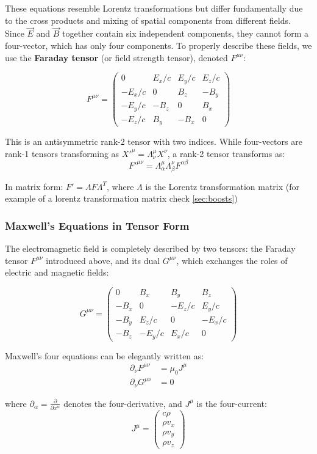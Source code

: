 \documentclass{article}
\begin{document}
These equations resemble Lorentz transformations but differ fundamentally due to the cross products and mixing of spatial components from different fields. Since $\vec{E}$ and $\vec{B}$ together contain six independent components, they cannot form a four-vector, which has only four components. To properly describe these fields, we use the \textbf{Faraday tensor} (or field strength tensor), denoted $F^{\mu\nu}$:

\[F^{\mu\nu} = \begin{pmatrix} 0 & E_x/c & E_y/c & E_z/c \\ -E_x/c & 0 & B_z & -B_y \\ -E_y/c & -B_z & 0 & B_x \\ -E_z/c & B_y & -B_x & 0 \end{pmatrix}\]

This is an antisymmetric rank-2 tensor with two indices. While four-vectors are rank-1 tensors transforming as $X'^{\mu} = \Lambda^{\mu}_{\nu} X^{\nu}$, a rank-2 tensor transforms as:
\[F'^{\mu\nu} = \Lambda^{\mu}_{\alpha} \Lambda^{\nu}_{\beta} F^{\alpha\beta}\]

In matrix form: $F' = \Lambda F \Lambda^T$, where $\Lambda$ is the Lorentz transformation matrix (for example of a lorentz transformation matrix check \ref{sec:boosts})


\subsubsection{Maxwell's Equations in Tensor Form}
The electromagnetic field is completely described by two tensors: the Faraday tensor $F^{\mu\nu}$ introduced above, and its dual $G^{\mu\nu}$, which exchanges the roles of electric and magnetic fields:

\[G^{\mu\nu} = \begin{pmatrix} 0 & B_x & B_y & B_z \\ -B_x & 0 & -E_z/c & E_y/c \\ -B_y & E_z/c & 0 & -E_x/c \\ -B_z & -E_y/c & E_x/c & 0 \end{pmatrix}\]

Maxwell's four equations can be elegantly written as:
\begin{align*}
\partial_\nu F^{\mu\nu} &= \mu_0 J^\mu \\
\partial_\nu G^{\mu\nu} &= 0
\end{align*}

where $\partial_\alpha = \frac{\partial}{\partial x^\alpha}$ denotes the four-derivative, and $J^\mu$ is the four-current:
\[J^\mu = \begin{pmatrix} c\rho \\ \rho v_x \\ \rho v_y \\ \rho v_z \end{pmatrix}\]
\end{document}

